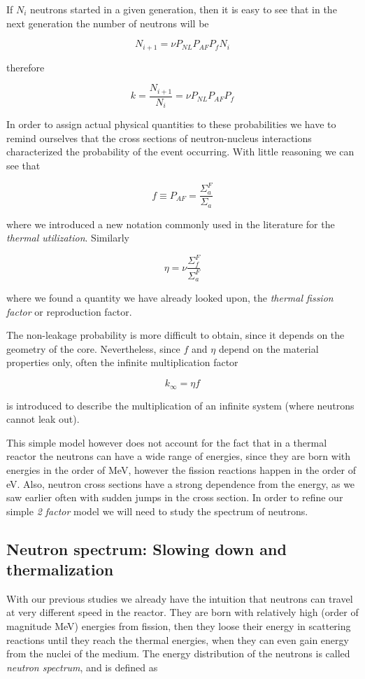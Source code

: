 If $N_i$ neutrons started in a given generation, then it is easy to see that in the next generation the number of neutrons will be

$$N_{i+1}=\nu P_{NL}P_{AF}P_{f}N_i$$

therefore

$$k=\frac{N_{i+1}}{N_i}=\nu P_{NL}P_{AF}P_{f}$$

In order to assign actual physical quantities to these probabilities we have to remind ourselves that the cross sections of neutron-nucleus interactions characterized the probability of the event occurring. With little reasoning we can see that

$$f\equiv P_{AF} = \frac{\Sigma_a^F}{\Sigma_a}$$

\noindent where we introduced a new notation commonly used in the literature for the \textit{thermal utilization}. Similarly 

$$\eta = \nu\frac{\Sigma_f^F}{\Sigma_a^F}$$

\noindent where we found a quantity we have already looked upon, the \textit{thermal fission factor} or reproduction factor.

The non-leakage probability is more difficult to obtain, since it depends on the geometry of the core. Nevertheless, since $f$ and $\eta$ depend on the material properties only, often the infinite multiplication factor 

$$k_\infty=\eta f$$

is introduced to describe the multiplication of an infinite system (where neutrons cannot leak out). 

This simple model however does not account for the fact that in a thermal reactor the neutrons can have a wide range of energies, since they are born with energies in the order of MeV, however the fission reactions happen in the order of eV. Also, neutron cross sections have a strong dependence from the energy, as we saw earlier often with sudden jumps in the cross section. In order to refine our simple \textit{2 factor} model we will need to study the spectrum of neutrons.

\subsection{Neutron spectrum: Slowing down and thermalization}

With our previous studies we already have the intuition that neutrons can travel at very different speed in the reactor. They are born with relatively high (order of magnitude MeV) energies from fission, then they loose their energy in scattering reactions until they reach the thermal energies, when they can even gain energy from the nuclei of the medium. The energy distribution of the neutrons is called \textit{neutron spectrum}, and is defined as 

